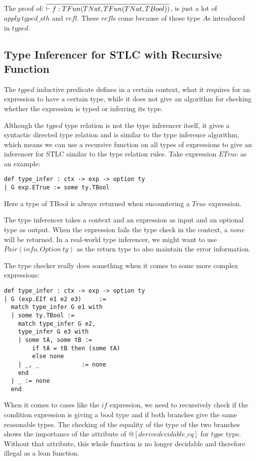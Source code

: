 \documentclass[conference]{IEEEtran}
\begin{document}
The proof of: $\infer{\vdash f:TFun(TNat, TFun(TNat,TBool))}{}$, is just
a lot of $apply\ typed\_sth$ and $refl$. These $refl$s come because of
those type $A$s introduced in $typed$.

\subsection{Type Inferencer for STLC with Recursive Function}
The $typed$ inductive predicate defines in a certain context,
what it requires for an expression to have a certain type, while it does not give
an algorithm for checking whether the expression is typed or inferring its type.

Although the $typed$ type relation is not the type inferencer itself,
it gives a syntactic directed type relation and
is similar to the type inference algorithm,
which means we can use a recursive function on all types of expressions
to give an inferencer for STLC similar to the type relation rules.
Take expression $ETrue$ as an example:

\begin{lstlisting}
def type_infer : ctx -> exp -> option ty
| G exp.ETrue := some ty.TBool
\end{lstlisting}
Here a type of TBool is always returned when encountering a $True$
expression.

The type inferencer takes a context and an expression as input and an
optional type as output. When the expression fails the type check in
the context, a $none$ will be returned. In a real-world type inferencer,
we might want to use $Pair(info, Option\ ty)$ as the return type to also
maintain the error information.

The type checker really does something when it comes to some more complex
expressions:

\begin{lstlisting}
def type_infer : ctx -> exp -> option ty
| G (exp.EIf e1 e2 e3)     :=
  match type_infer G e1 with
  | some ty.TBool :=
    match type_infer G e2, 
    type_infer G e3 with
    | some tA, some tB := 
        if tA = tB then (some tA) 
        else none
    | _, _            := none
    end
  | _ := none
  end
\end{lstlisting}
When it comes to cases like the $if$ expression, we need to recursively check if the
condition expression is giving a bool type and if both branches give the same
reasonable types. The checking of the equality of the type of the two
branches shows the importance of the attribute of $@[derive decidable\_eq]$
for $type$ type. Without that attribute, this whole function is no longer
decidable and therefore illegal as a lean function.
\end{document}

